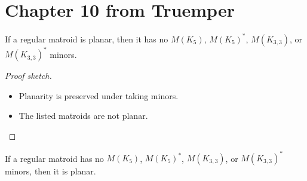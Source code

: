\section{Chapter 10 from Truemper}

\begin{theorem}[10.2.11 only if]
  \label{thm:10.2.11.only_if}
  If a regular matroid is planar, then it has no $M(K_{5})$, $M(K_{5})^{*}$, $M(K_{3,3})$, or $M(K_{3,3})^{*}$ minors.
\end{theorem}

\begin{proof}[Proof sketch]
  \begin{itemize}
    \item Planarity is preserved under taking minors.
    \item The listed matroids are not planar.
  \end{itemize}
\end{proof}

\begin{theorem}[10.2.11 if]
  \label{thm:10.2.11.if}
  If a regular matroid has no $M(K_{5})$, $M(K_{5})^{*}$, $M(K_{3,3})$, or $M(K_{3,3})^{*}$ minors, then it is planar.
\end{theorem}

